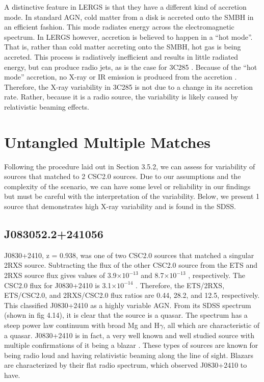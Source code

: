 A distinctive feature in LERGS is that they have a different kind of accretion mode. 
In standard AGN, cold matter from a disk is accreted onto the SMBH in an efficient fashion.
This mode radiates energy across the electromagnetic spectrum. In LERGS however, accretion is believed to happen in a “hot mode”.
That is, rather than cold matter accreting onto the SMBH, hot gas is being accreted. 
This process is radiatively inefficient and results in little radiated energy, but can produce radio jets, as is the case for 3C285 \citep{best2012}. 
Because of the “hot mode” accretion, no X-ray or IR emission is produced from the accretion \citep{hardcastle2007}. 
Therefore, the X-ray variability in 3C285 is not due to a change in its accretion rate. Rather, because it is a radio source, the variability is likely caused by relativistic beaming effects.

\section{Untangled Multiple Matches}


Following the procedure laid out in Section 3.5.2, we can assess for variability of sources that matched to 2 CSC2.0 sources. Due to our assumptions and the complexity of the scenario, we can have some level or reliability in our findings but must be careful with the interpretation of the variability. Below, we present 1 source that demonstrates high X-ray variability and is found in the SDSS.

\subsection{J083052.2+241056}


J0830+2410, z = 0.938, was one of two CSC2.0 sources that matched a singular 2RXS source. Subtracting the flux of the other CSC2.0 source from the ETS and 2RXS source flux gives values of 3.9$\times 10^{-13}$ \fluxunits and 8.7$\times 10^{-13}$ \fluxunits, respectively. 
The CSC2.0 flux for J0830+2410 is 3.1$\times 10^{-14}$ \fluxunits. 
Therefore, the ETS/2RXS, ETS/CSC2.0, and 2RXS/CSC2.0 flux ratios are 0.44, 28.2, and 12.5, respectively. 
This classified J0830+2410 as a highly variable AGN. From its SDSS spectrum (shown in fig 4.14), it is clear that the source is a quasar. 
The spectrum has a steep power law continuum with broad Mg and H$\gamma$, all which are characteristic of a quasar.
J0830+2410 is in fact, a very well known and well studied source with multiple confirmations of it being a blazar \citep{arsioli2018}. 
These types of sources are known for being radio loud and having relativistic beaming along the line of sight. Blazars are characterized by their flat radio spectrum, which \cite{healey2007} observed J0830+2410 to have.


